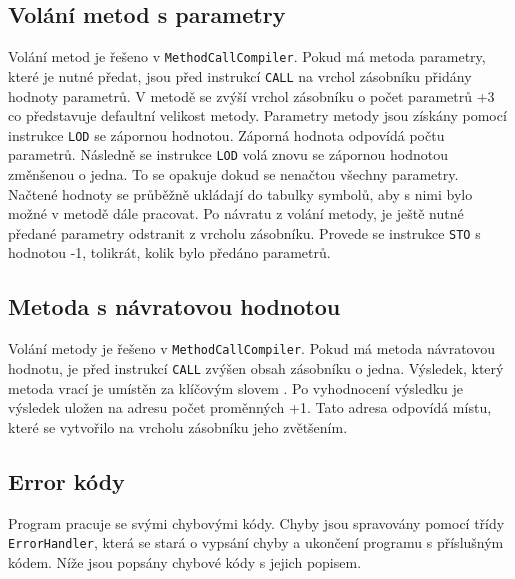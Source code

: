 \documentclass[12pt, a4paper]{article}
\begin{document}
\subsection{Volání metod s parametry}
\noindent Volání metod je řešeno v \texttt{MethodCallCompiler}. Pokud má metoda parametry, které je nutné předat, jsou před instrukcí \texttt{CALL} na vrchol zásobníku přidány hodnoty parametrů. V metodě se zvýší vrchol zásobníku o počet parametrů +3 co představuje defaultní velikost metody. Parametry metody jsou získány pomocí instrukce \texttt{LOD} se zápornou hodnotou. Záporná hodnota odpovídá počtu parametrů. Následně se instrukce \texttt{LOD} volá znovu se zápornou hodnotou změnšenou o jedna. To se opakuje dokud se nenačtou všechny parametry. Načtené hodnoty se průběžně ukládají do tabulky symbolů, aby s nimi bylo možné v metodě dále pracovat. Po návratu z volání metody, je ještě nutné předané parametry odstranit z vrcholu zásobníku. Provede se instrukce \texttt{STO} s hodnotou -1, tolikrát, kolik bylo předáno parametrů.

\subsection{Metoda s návratovou hodnotou}
\noindent Volání metody je řešeno v \texttt{MethodCallCompiler}. Pokud má metoda návratovou hodnotu, je před instrukcí \texttt{CALL} zvýšen obsah zásobníku o jedna. Výsledek, který metoda vrací je umístěn za klíčovým slovem . Po vyhodnocení výsledku je výsledek uložen na adresu počet proměnných +1. Tato adresa odpovídá místu, které se vytvořilo na vrcholu zásobníku jeho zvětšením.

\subsection{Error kódy}
\noindent Program pracuje se svými chybovými kódy. Chyby jsou spravovány pomocí třídy \texttt{ErrorHandler}, která se stará o vypsání chyby a ukončení programu s příslušným kódem. Níže jsou popsány chybové kódy s jejich popisem.
\end{document}
